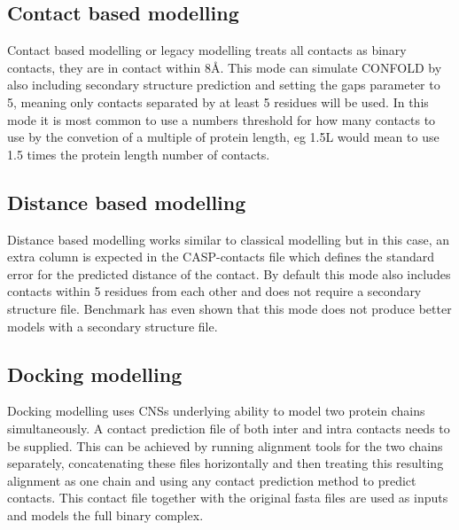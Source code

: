 \documentclass{bioinfo}
\begin{document}
\subsection{Contact based modelling}
Contact based modelling or legacy modelling treats all contacts as binary contacts, they are in contact within 8Å. This mode can simulate CONFOLD by also including secondary structure prediction and setting the gaps parameter to 5, meaning only contacts separated by at least 5 residues will be used. In this mode it is most common to use a numbers threshold for how many contacts to use by the convetion of a multiple of protein length, eg 1.5L would mean to use 1.5 times the protein length number of contacts.

\subsection{Distance based modelling}
Distance based modelling works similar to classical modelling but in this case, an extra column is expected in the CASP-contacts file which defines the standard error for the predicted distance of the contact. By default this mode also includes contacts within 5 residues from each other and does not require a secondary structure file. Benchmark has even shown that this mode does not produce better models with a secondary structure file.

\subsection{Docking modelling}
Docking modelling uses CNSs underlying ability to model two protein chains simultaneously. A contact prediction file of both inter and intra contacts needs to be supplied. This can be achieved by running alignment tools for the two chains separately, concatenating these files horizontally and then treating this resulting alignment as one chain and using any contact prediction method to predict contacts. This contact file together with the original fasta files are used as inputs and models the full binary complex.
\end{document}
